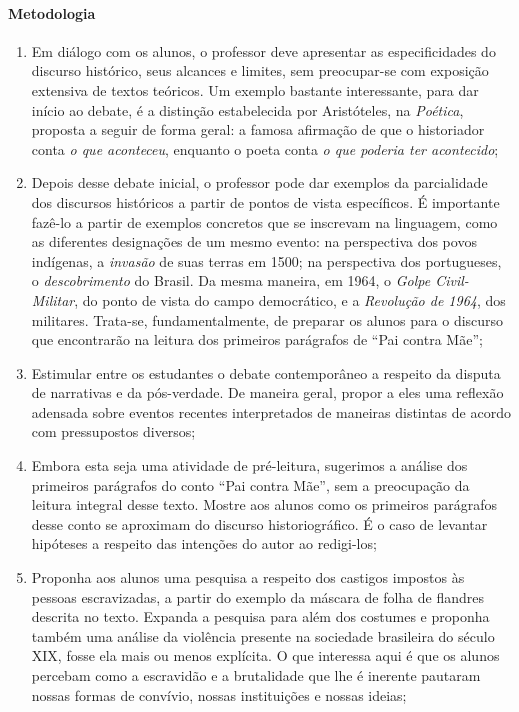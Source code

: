 \documentclass[11pt]{extarticle}
\begin{document}
\paragraph{Metodologia}

\begin{enumerate}
\item Em diálogo com os alunos, o professor deve apresentar as
especificidades do discurso histórico, seus alcances e limites, sem
preocupar-se com exposição extensiva de textos teóricos. Um exemplo
bastante interessante, para dar início ao debate, é a distinção
estabelecida por Aristóteles, na \emph{Poética}, proposta a seguir de
forma geral: a famosa afirmação de que o historiador conta \emph{o que
aconteceu}, enquanto o poeta conta \emph{o que poderia ter acontecido};

\item Depois desse debate inicial, o professor pode dar exemplos da
parcialidade dos discursos históricos a partir de pontos de vista
específicos. É importante fazê-lo a partir de exemplos concretos que se
inscrevam na linguagem, como as diferentes designações de um mesmo
evento: na perspectiva dos povos indígenas, a \emph{invasão} de suas
terras em 1500; na perspectiva dos portugueses, o \emph{descobrimento}
do Brasil. Da mesma maneira, em 1964, o \emph{Golpe Civil-Militar}, do
ponto de vista do campo democrático, e a \emph{Revolução de 1964}, dos
militares. Trata-se, fundamentalmente, de preparar os alunos para o
discurso que encontrarão na leitura dos primeiros parágrafos de ``Pai
contra Mãe'';

\item Estimular entre os estudantes o debate contemporâneo a respeito da
disputa de narrativas e da pós-verdade. De maneira geral, propor a eles
uma reflexão adensada sobre eventos recentes interpretados de maneiras
distintas de acordo com pressupostos diversos;

\item Embora esta seja uma atividade de pré-leitura, sugerimos a análise
dos primeiros parágrafos do conto ``Pai contra Mãe'', sem a preocupação
da leitura integral desse texto. Mostre aos alunos como os primeiros
parágrafos desse conto se aproximam do discurso historiográfico. É o
caso de levantar hipóteses a respeito das intenções do autor ao
redigi-los;

\item Proponha aos alunos uma pesquisa a respeito dos castigos impostos às
pessoas escravizadas, a partir do exemplo da máscara de folha de
flandres descrita no texto. Expanda a pesquisa para além dos costumes e
proponha também uma análise da violência presente na sociedade
brasileira do século XIX, fosse ela mais ou menos explícita. O que
interessa aqui é que os alunos percebam como a escravidão e a
brutalidade que lhe é inerente pautaram nossas formas de convívio,
nossas instituições e nossas ideias;


\end{enumerate}
\end{document}
